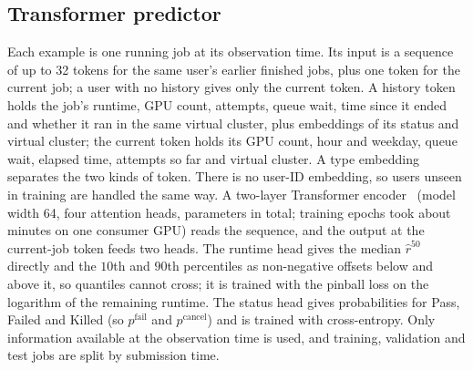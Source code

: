 \subsection{Transformer predictor}
Each example is one running job at its observation time. Its input is a sequence of up to 32 tokens for the same user's earlier finished jobs, plus one token for the current job; a user with no history gives only the current token. A history token holds the job's runtime, GPU count, attempts, queue wait, time since it ended and whether it ran in the same virtual cluster, plus embeddings of its status and virtual cluster; the current token holds its GPU count, hour and weekday, queue wait, elapsed time, attempts so far and virtual cluster. A type embedding separates the two kinds of token. There is no user-ID embedding, so users unseen in training are handled the same way.
A two-layer Transformer encoder~\cite{vaswani17} (model width 64, four attention heads, \TfParams{} parameters in total; \TfEpochs{} training epochs took about \TfTrainMin{} minutes on one consumer GPU) reads the sequence, and the output at the current-job token feeds two heads. The runtime head gives the median $\hat r^{50}$ directly and the $10$th and $90$th percentiles as non-negative offsets below and above it, so quantiles cannot cross; it is trained with the pinball loss on the logarithm of the remaining runtime. The status head gives probabilities for Pass, Failed and Killed (so $p^{\text{fail}}$ and $p^{\text{cancel}}$) and is trained with cross-entropy. Only information available at the observation time is used, and training, validation and test jobs are split by submission time.
